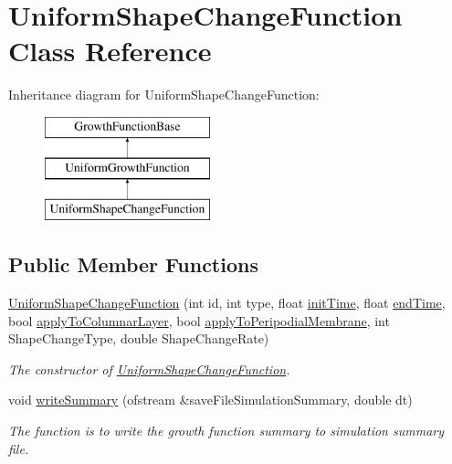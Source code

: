 \hypertarget{classUniformShapeChangeFunction}{}\section{Uniform\+Shape\+Change\+Function Class Reference}
\label{classUniformShapeChangeFunction}
Inheritance diagram for Uniform\+Shape\+Change\+Function\+:\begin{figure}[H]
\begin{center}
\leavevmode
\includegraphics[height=3.000000cm]{classUniformShapeChangeFunction}
\end{center}
\end{figure}
\subsection*{Public Member Functions}
\begin{DoxyCompactItemize}
\item 
\hyperlink{classUniformShapeChangeFunction_a5c4c1a853ab2623416469d3e8b37245a}{Uniform\+Shape\+Change\+Function} (int id, int type, float \hyperlink{classGrowthFunctionBase_ae92513a7b41637df8e26e7db35ddf97c}{init\+Time}, float \hyperlink{classGrowthFunctionBase_a3ff4db0573d354a75666a5f3ca446941}{end\+Time}, bool \hyperlink{classGrowthFunctionBase_a3d56771e7c145589a14e11cc331e0326}{apply\+To\+Columnar\+Layer}, bool \hyperlink{classGrowthFunctionBase_a08ae19f58cb98fa8e315a77f52749732}{apply\+To\+Peripodial\+Membrane}, int Shape\+Change\+Type, double Shape\+Change\+Rate)
\begin{DoxyCompactList}\small\item\em The constructor of \hyperlink{classUniformShapeChangeFunction}{Uniform\+Shape\+Change\+Function}. \end{DoxyCompactList}\item 
void \hyperlink{classUniformShapeChangeFunction_a196a7555899800406ee62714a20b34c4}{write\+Summary} (ofstream \&save\+File\+Simulation\+Summary, double dt)
\begin{DoxyCompactList}\small\item\em The function is to write the growth function summary to simulation summary file. \end{DoxyCompactList}\end{DoxyCompactItemize}
